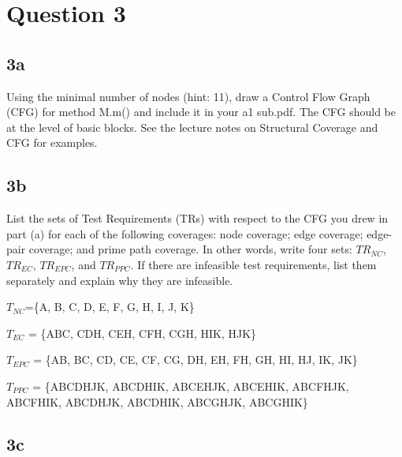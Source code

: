 \documentclass[12pt]{article}
\begin{document}
\section*{Question 3}
\subsection*{3a}
Using the minimal number of nodes (hint: 11), draw a Control Flow Graph (CFG) for method M.m() and
include it in your a1 sub.pdf. The CFG should be at the level of basic blocks. See the lecture notes on Structural
Coverage and CFG for examples.



\subsection*{3b}
List the sets of Test Requirements (TRs) with respect to the CFG you drew in part (a) for each of the following
coverages: node coverage; edge coverage; edge-pair coverage; and prime path coverage. In other words, write
four sets: $TR_{NC}$, $TR_{EC}$, $TR_{EPC}$, and $TR_{PPC}$. If there are infeasible test requirements, list them separately
and explain why they are infeasible.


$T_{NC}$=\{A, B, C, D, E, F, G, H, I, J, K\}

$T_{EC}$ = \{ABC, CDH, CEH, CFH, CGH, HIK, HJK\}

$T_{EPC}$ = \{AB, BC, CD, CE, CF, CG, DH, EH, FH, GH, HI, HJ, IK, JK\}

$T_{PPC}$ = \{ABCDHJK, ABCDHIK, ABCEHJK, ABCEHIK, ABCFHJK, ABCFHIK, ABCDHJK, ABCDHIK, ABCGHJK, ABCGHIK\}

\subsection*{3c}
\end{document}
